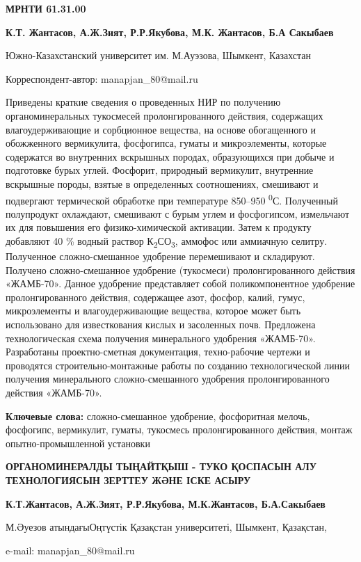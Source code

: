 \newpage
{\bfseries МРНТИ 61.31.00}


\begin{center}
{\bfseries К.Т. Жантасов, А.Ж.Зият, Р.Р.Якубова, М.К. Жантасов, Б.А Сакыбаев}

Южно-Казахстанский университет им. М.Ауэзова, Шымкент, Казахстан

Корреспондент-автор: manapjan\_80@mail.ru
\end{center}

Приведены краткие сведения о проведенных НИР по получению
органоминеральных тукосмесей пролонгированного действия, содержащих
влагоудерживающие и сорбционное вещества, на основе обогащенного и
обожженного вермикулита, фосфогипса, гуматы и микроэлементы, которые
содержатся во внутренних вскрышных породах, образующихся при добыче и
подготовке бурых углей. Фосфорит, природный вермикулит, внутренние
вскрышные породы, взятые в определенных соотношениях, смешивают и
подвергают термической обработке при температуре 850--950
\textsuperscript{0}С. Полученный полупродукт охлаждают, смешивают с
бурым углем и фосфогипсом, измельчают их для повышения его
физико-химической активации. Затем к продукту добавляют 40 \% водный
раствор К\textsubscript{2}СО\textsubscript{3}, аммофос или аммиачную
селитру. Полученное сложно-смешанное удобрение перемешивают и
складируют. Получено сложно-смешанное удобрение (тукосмеси)
пролонгированного действия «ЖАМБ-70». Данное удобрение представляет
собой поликомпонентное удобрение пролонгированного действия, содержащее
азот, фосфор, калий, гумус, микроэлементы и влагоудерживающие вещества,
которое может быть использовано для известкования кислых и засоленных
почв. Предложена технологическая схема получения минерального удобрения
«ЖАМБ-70». Разработаны проектно-сметная документация, техно-рабочие
чертежи и проводятся строительно-монтажные работы по созданию
технологической линии получения минерального сложно-смешанного удобрения
пролонгированного действия «ЖАМБ-70».

{\bfseries Ключевые слова:} сложно-смешанное удобрение, фосфоритная мелочь,
фосфогипс, вермикулит, гуматы, тукосмесь пролонгированного действия,
монтаж опытно-промышленной установки

\begin{center}
{\large\bfseries ОРГАНОМИНЕРАЛДЫ ТЫҢАЙТҚЫШ - ТУКО ҚОСПАСЫН АЛУ ТЕХНОЛОГИЯСЫН ЗЕРТТЕУ ЖӘНЕ ІСКЕ АСЫРУ}

{\bfseries К.Т.Жантасов, А.Ж.Зият, Р.Р.Якубова, М.К.Жантасов, Б.А.Сакыбаев}

М.Әуезов атындағыОңтүстік Қазақстан университеті, Шымкент, Қазақстан,

e-mail: manapjan\_80@mail.ru
\end{center}

